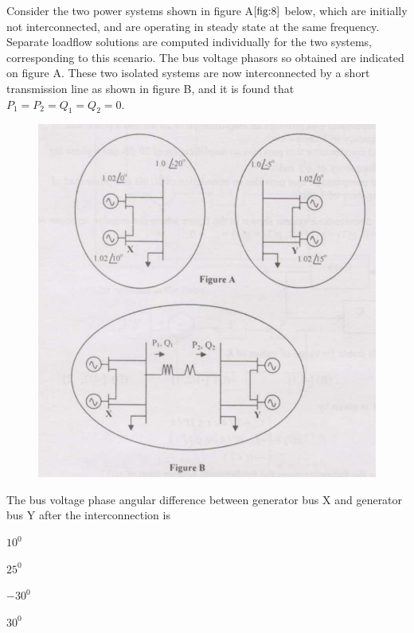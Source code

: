 \bigskip
\item Consider the two power systems shown in figure A$\ref{fig:8}$ below, which are initially not interconnected, and are operating in steady state at the same frequency. Separate loadflow solutions are computed individually for the two systems, corresponding to this scenario. The bus voltage phasors so obtained are indicated on figure A. These two isolated systems are now interconnected by a short transmission line as shown in figure B, and it is  found that $P_1=P_2=Q_1=Q_2=0$.
\begin{figure}[!ht]
    \centering
    \includegraphics[width=\linewidth]{GATE-yearwise/Assignment2/figs/8.png}
    \caption{}
    \label{fig:8}
    \end{figure}
The bus voltage phase angular difference between generator bus X and generator bus Y after the interconnection is
\begin{enumerate}
    \begin{multicols}{4}
        \item $10^0$
        \item $25^0$
        \item $-30^0$
        \item $30^0$
    \end{multicols}
\end{enumerate}
